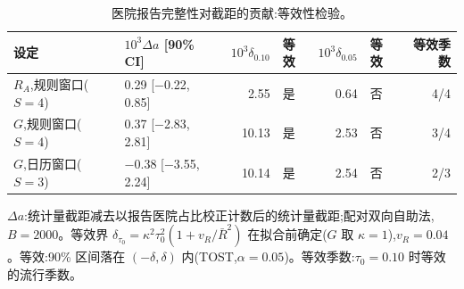 \begin{table}[htbp]
\centering
\footnotesize
\caption{医院报告完整性对截距的贡献:等效性检验。}
\label{tab:s3}
\begin{tabular}{llrlrlr}
\toprule
设定 & $10^3\Delta a$ [90\% CI] & $10^3\delta_{0.10}$ & 等效 & $10^3\delta_{0.05}$ & 等效 & 等效季数 \\
\midrule
$R_A$,规则窗口($S=4$) & 0.29 [$-$0.22, 0.85] & 2.55 & 是 & 0.64 & 否 & 4/4 \\
$G$,规则窗口($S=4$) & 0.37 [$-$2.83, 2.81] & 10.13 & 是 & 2.53 & 否 & 3/4 \\
$G$,日历窗口($S=3$) & $-$0.38 [$-$3.55, 2.24] & 10.14 & 是 & 2.54 & 否 & 2/3 \\
\bottomrule
\end{tabular}
\par\smallskip
\begin{minipage}{0.95\linewidth}\scriptsize $\Delta a$:统计量截距减去以报告医院占比校正计数后的统计量截距;配对双向自助法,$B=2000$。等效界 $\delta_{\tau_0}=\kappa^2\tau_0^2(1+v_R/\bar{R}^2)$ 在拟合前确定($G$ 取 $\kappa=1$),$v_R=0.04$。等效:90\% 区间落在 $(-\delta,\delta)$ 内(TOST,$\alpha=0.05$)。等效季数:$\tau_0=0.10$ 时等效的流行季数。\end{minipage}
\end{table}
